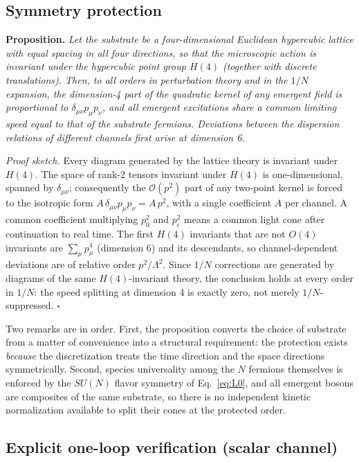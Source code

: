 \documentclass[11pt,a4paper]{article}
\begin{document}
\subsection{Symmetry protection}

\textbf{Proposition.}
\emph{Let the substrate be a four-dimensional Euclidean hypercubic
lattice with equal spacing in all four directions, so that the
microscopic action is invariant under the hypercubic point group
$H(4)$ (together with discrete translations).
Then, to all orders in perturbation theory and in the $1/N$
expansion, the dimension-4 part of the quadratic kernel of any
emergent field is proportional to $\delta_{\mu\nu}p_\mu p_\nu$,
and all emergent excitations share a common limiting speed equal
to that of the substrate fermions.
Deviations between the dispersion relations of different channels
first arise at dimension 6.}

\emph{Proof sketch.}
Every diagram generated by the lattice theory is invariant under
$H(4)$.
The space of rank-2 tensors invariant under $H(4)$ is
one-dimensional, spanned by $\delta_{\mu\nu}$; consequently the
$\mathcal{O}(p^2)$ part of any two-point kernel is forced to the
isotropic form $A\,\delta_{\mu\nu}p_\mu p_\nu = A\,p^2$, with a
single coefficient $A$ per channel.
A common coefficient multiplying $p_0^2$ and $p_i^2$ means a common
light cone after continuation to real time.
The first $H(4)$ invariants that are not $O(4)$ invariants are
$\sum_\mu p_\mu^4$ (dimension 6) and its descendants, so
channel-dependent deviations are of relative order $p^2/\Lambda^2$.
Since $1/N$ corrections are generated by diagrams of the same
$H(4)$-invariant theory, the conclusion holds at every order in
$1/N$: the speed splitting at dimension 4 is exactly zero, not
merely $1/N$-suppressed. \hfill$\square$

Two remarks are in order.
First, the proposition converts the choice of substrate from a
matter of convenience into a structural requirement: the protection
exists \emph{because} the discretization treats the time direction
and the space directions symmetrically.
Second, species universality among the $N$ fermions themselves is
enforced by the $SU(N)$ flavor symmetry of Eq.~\eqref{eq:L0}, and
all emergent bosons are composites of the same substrate, so there
is no independent kinetic normalization available to split their
cones at the protected order.

\subsection{Explicit one-loop verification (scalar channel)}
\end{document}
